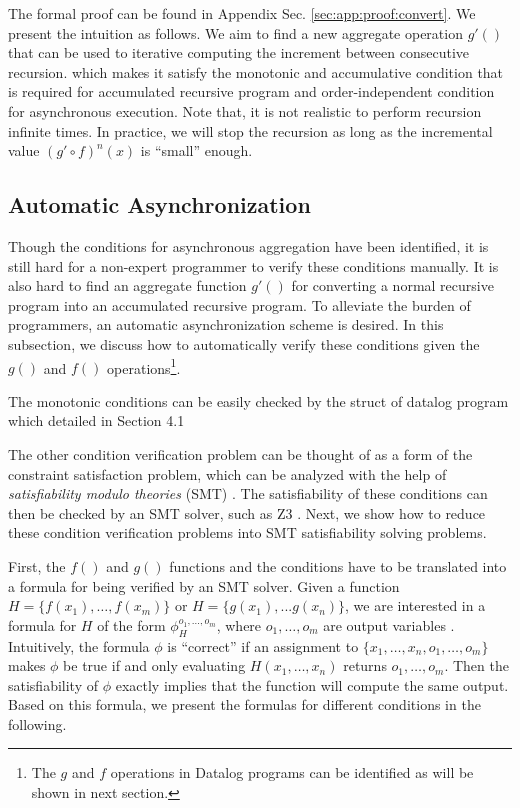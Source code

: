 The formal proof can be found in Appendix Sec. \ref{sec:app:proof:convert}. We present the intuition as follows. We aim to find a new aggregate operation $g'()$ that can be used to iterative computing the increment between consecutive recursion. which makes it satisfy the monotonic and accumulative condition that is required for accumulated recursive program and order-independent condition for asynchronous execution.
Note that, it is not realistic to perform recursion infinite times. In practice, we will stop the recursion as long as the incremental value $(g'\circ f)^n(x)$ is ``small'' enough.




\subsection{Automatic Asynchronization}
\label{sec:async:autoasync}

Though the conditions for asynchronous aggregation have been identified, it is still hard for a non-expert programmer to verify these conditions manually. It is also hard to find an aggregate function $g'()$ for converting a normal recursive program into an accumulated recursive program.
 To alleviate the burden of programmers, an automatic asynchronization scheme is desired. In this subsection, we discuss how to automatically verify these conditions given the $g()$ and $f()$ operations\footnote{The $g$ and $f$ operations in Datalog programs can be identified as will be shown in next section.}.
 
 
 The monotonic conditions can  be easily checked by the struct of datalog program which detailed in Section 4.1

The other condition verification problem can be thought of as a form of the constraint satisfaction problem, which can be analyzed with the help of \emph{satisfiability modulo theories} (SMT) \cite{53e486195688442995f82bfe28c55731}. The satisfiability of these conditions can then be checked by an SMT solver, such as Z3 \cite{DeMoura:2008:ZES:1792734.1792766}. Next, we show how to reduce these condition verification problems into SMT satisfiability solving problems.

First, the $f()$ and $g()$ functions and the conditions have to be translated into a formula for being verified by an SMT solver. Given a function $H=\{f(x_1),\ldots,f(x_m)\}$ or $H=\{g(x_1),...g(x_n)\}$, we are interested in a formula for $H$ of the form $\phi_H^{o_1,\ldots,o_m}$, where $o_1,\ldots,o_m$ are output variables \cite{Liu:2014:ADP:2670979.2670980}. Intuitively, the formula $\phi$ is ``correct'' if an assignment to $\{x_1,\ldots,x_n,o_1,\ldots,o_m\}$ makes $\phi$ be true if and only evaluating $H(x_1,\ldots,x_n)$ returns $o_1,\ldots,o_m$. Then the satisfiability of $\phi$ exactly implies that the function will compute the same output. Based on this formula, we present the formulas for different conditions in the following.

